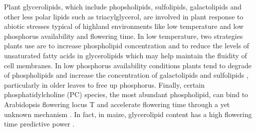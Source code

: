 \documentclass[9pt,twocolumn,twoside,lineno]{BioRxiv}
\begin{document}
Plant glycerolipids, which include phopsholipids, sulfolipids, galactolipids and other less polar lipids such as triacylglycerol, are involved in plant response to abiotic stresses typical of highland environments like low temperature and low phosphorus availability and flowering time.
In low temperature, two strategies plants use are to increase phospholipid concentration \cite{Degenkolbe2012-wf} and to reduce the levels of unsaturated fatty acids in glycerolipids \cite{Welti2002-uk, Lynch1987-ln} which may help maintain the fluidity of cell membranes.
In low phosphorus availability conditions plants tend to  degrade of phospholipids and increase the concentration of galactolipids and sulfolipids \cite{Lambers2012-an}, particularly in older leaves to free up phosphorus. 
Finally, certain phosphatidylcholine (PC) species, the most abundant phospholipid, can bind to Arabidopsis flowering locus T and accelerate flowering time through a yet unknown mechanism \cite{Nakamura2014-qf}. 
In fact, in maize, glycerolipid content has a high flowering time predictive power \cite{Riedelsheimer2013-bd}. 
\end{document}
